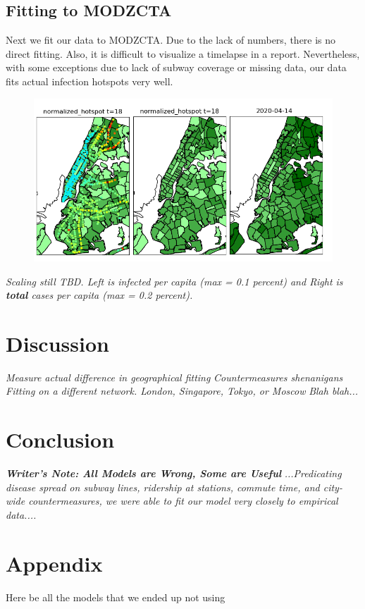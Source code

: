 \documentclass[12pt, a4, epsf] {article}
\theoremstyle{plain}
\theoremstyle{definition}
\begin{document}
\subsection{Fitting to MODZCTA}
Next we fit our data to MODZCTA. Due to the lack of numbers, there is no direct fitting. Also, it is difficult to visualize a timelapse in a report. Nevertheless, with some exceptions due to lack of subway coverage or missing data, our data fits actual infection hotspots very well.\\
\begin{figure}[htbp]
\includegraphics[width = 1.0\textwidth]{Scratch_Visuals/NYC_Geo_Fitting.png}
\end{figure}
\FloatBarrier
\textit{Scaling still TBD. Left is infected per capita (max = 0.1 percent) and Right is \textbf{total} cases per capita (max = 0.2 percent).}
\FloatBarrier
\section*{Discussion}
\textit{Measure actual difference in geographical fitting}
\textit{Countermeasures shenanigans}
\textit{Fitting on a different network. London, Singapore, Tokyo, or Moscow}
\textit{Blah blah...}
\section*{Conclusion}
\textbf{\textit{Writer's Note: All Models are Wrong, Some are Useful}}
\textit{...Predicating disease spread on subway lines, ridership at stations, commute time, and city-wide countermeasures, we were able to fit our model very closely to empirical data....}

\nocite{*}
{}

\section{Appendix}
Here be all the models that we ended up not using
\end{document}
